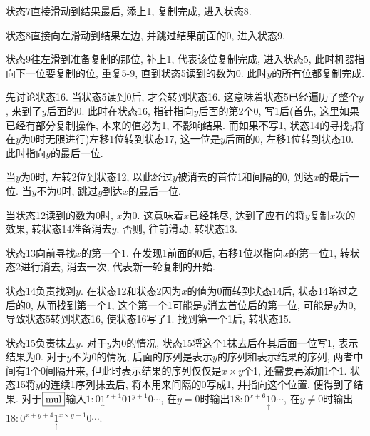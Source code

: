 \begin{solution}
状态7直接滑动到结果最后, 添上1, 复制完成, 进入状态8.

状态8直接向左滑动到结果左边, 并跳过结果前面的0, 进入状态9.

状态9往左滑到准备复制的那位, 补上1, 代表该位复制完成, 进入状态5, 此时机器指向下一位要复制的位, 重复5-9, 直到状态5读到的数为0. 此时$y$的所有位都复制完成.

先讨论状态16. 当状态5读到0后, 才会转到状态16. 这意味着状态5已经遍历了整个$y$, 来到了$y$后面的0. 此时在状态16, 指针指向$y$后面的第2个0, 写1后(首先, 这里如果已经有部分复制操作, 本来的值必为1, 不影响结果. 而如果不写1, 状态14的寻找$y$将在$y$为0时无限进行)左移1位转到状态17, 这一位是$y$后面的0, 左移1位转到状态10. 此时指向$y$的最后一位.

当$y$为0时, 左转2位到状态12, 以此经过$y$被消去的首位1和间隔的0, 到达$x$的最后一位. 当$y$不为0时, 跳过$y$到达$x$的最后一位.

当状态12读到的数为0时, $x$为0. 这意味着$x$已经耗尽, 达到了应有的将$y$复制$x$次的效果, 转状态14准备消去$y$. 否则, 往前滑动, 转状态13.

状态13向前寻找$x$的第一个1. 在发现1前面的0后, 右移1位以指向$x$的第一位1, 转状态2进行消去, 消去一次, 代表新一轮复制的开始.

状态14负责找到$y$. 在状态12和状态2因为$x$的值为0而转到状态14后, 状态14略过之后的0, 从而找到第一个1, 这个第一个1可能是$y$消去首位后的第一位, 可能是$y$为0, 导致状态5转到状态16, 使状态16写了1. 找到第一个1后, 转状态15.

状态15负责抹去$y$. 对于$y$为0的情况, 状态15将这个1抹去后在其后面一位写1, 表示结果为0. 对于$y$不为0的情况, 后面的序列是表示$y$的序列和表示结果的序列, 两者中间有1个0间隔开来, 但此时表示结果的序列仅仅是$x\times y$个1, 还需要再添加1个1. 状态15将$y$的连续1序列抹去后, 将本用来间隔的0写成1, 并指向这个位置, 便得到了结果.
\fi
对于$\boxed{\mathrm{mul}}$输入$1:0\underset{\uparrow}{1}^{x+1}01^{y+1}0\cdots$, 在$y=0$时输出$18:0^{x+6}\underset{\uparrow}{1}0\cdots$, 在$y\neq 0$时输出$18:0^{x+y+4}\underset{\uparrow}{1}^{x\times y + 1}0\cdots$.
\end{solution}
